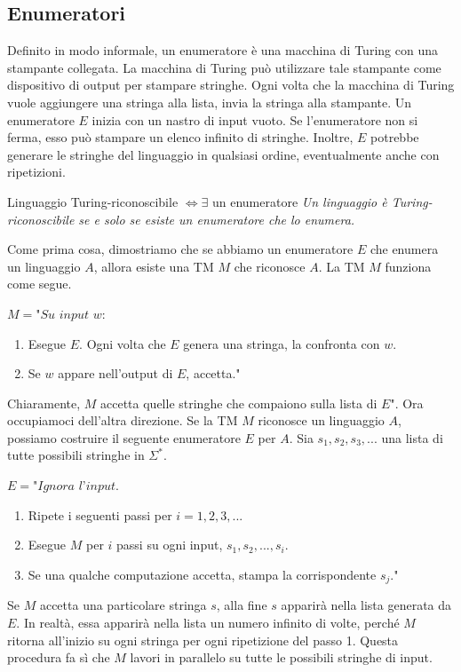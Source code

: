 \subsection{Enumeratori}
Definito in modo informale, un enumeratore è una macchina di Turing con una stampante collegata. La macchina di Turing può utilizzare tale stampante come dispositivo di output per stampare stringhe. Ogni volta che la macchina di Turing vuole aggiungere una stringa alla lista, invia la stringa alla stampante.
Un enumeratore $E$ inizia con un nastro di input vuoto. Se l'enumeratore non si ferma, esso può stampare un elenco infinito di stringhe. Inoltre, $E$ potrebbe generare le stringhe del linguaggio in qualsiasi ordine, eventualmente anche con ripetizioni.

\begin{Thm}{Linguaggio Turing-riconoscibile $\iff\exists$ un enumeratore}{}
\textit{Un linguaggio è Turing-riconoscibile se e solo se esiste un enumeratore che lo enumera.}

\begin{demonstration}
Come prima cosa, dimostriamo che se abbiamo un enumeratore $E$ che enumera un linguaggio $A$, allora esiste una TM $M$ che riconosce $A$. La TM $M$ funziona come segue.

$M=\textit{"Su input }w$:
\begin{enumerate}
    \item Esegue $E$. Ogni volta che $E$ genera una stringa, la confronta con $w$.
    \item Se $w$ appare nell'output di $E$, accetta."
\end{enumerate}

Chiaramente, $M$ accetta quelle stringhe che compaiono sulla lista di $E$". Ora occupiamoci dell'altra direzione. Se la TM $M$ riconosce un linguaggio $A$, possiamo costruire il seguente enumeratore $E$ per $A$. Sia $s_1, s_2, s_3,...$ una lista di tutte possibili stringhe in $\Sigma^*$.

$E=\textit{"Ignora l'input}$.
\begin{enumerate}
    \item Ripete i seguenti passi per $i = 1,2,3,...$
    \item Esegue $M$ per $i$ passi su ogni input, $s_1, s_2,..., s_i$.
    \item Se una qualche computazione accetta, stampa la corrispondente $s_j$."
\end{enumerate}

Se $M$ accetta una particolare stringa $s$, alla fine $s$ apparirà nella lista generata da $E$. In realtà, essa apparirà nella lista un numero infinito di volte, perché $M$ ritorna all'inizio su ogni stringa per ogni ripetizione del passo 1. Questa procedura fa sì che $M$ lavori in parallelo su tutte le possibili stringhe di input.
\end{demonstration}
\end{Thm}